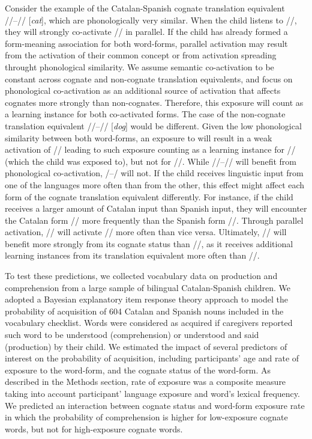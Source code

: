 \documentclass[
]{article}
\begin{document}
Consider the example of the Catalan-Spanish cognate translation
equivalent //--// {[}\emph{cat}{]}, which
are phonologically very similar. When the child listens to
//, they will strongly co-activate // in
parallel. If the child has already formed a form-meaning association for
both word-forms, parallel activation may result from the activation of
their common concept or from activation spreading throught phonological
similarity. We assume semantic co-activation to be constant across
cognate and non-cognate translation equivalents, and focus on
phonological co-activation as an additional source of activation that
affects cognates more strongly than non-cognates. Therefore, this
exposure will count as a learning instance for both co-activated forms.
The case of the non-cognate translation equivalent
//--// {[}\emph{dog}{]} would be
different. Given the low phonological similarity between both
word-forms, an exposure to  will result in a weak
activation of // leading to such exposure counting as a
learning instance for // (which the child was exposed to),
but not for //. While
//--// will benefit from phonological
co-activation, /--/ will not. If the child
receives linguistic input from one of the languages more often than from
the other, this effect might affect each form of the cognate translation
equivalent differently. For instance, if the child receives a larger
amount of Catalan input than Spanish input, they will encounter the
Catalan form // more frequently than the Spanish form
//. Through parallel activation, // will
activate // more often than vice versa. Ultimately,
// will benefit more strongly from its cognate status
than //, as it receives additional learning instances from
its translation equivalent more often than //.

To test these predictions, we collected vocabulary data on production
and comprehension from a large sample of bilingual Catalan-Spanish
children. We adopted a Bayesian explanatory item response theory
approach to model the probability of acquisition of 604 Catalan and
Spanish nouns included in the vocabulary checklist. Words were
considered as acquired if caregivers reported such word to be understood
(comprehension) or understood and said (production) by their child. We
estimated the impact of several predictors of interest on the
probability of acquisition, including participants' age and rate of
exposure to the word-form, and the cognate status of the word-form. As
described in the Methods section, rate of exposure was a composite
measure taking into account participant' language exposure and word's
lexical frequency. We predicted an interaction between cognate status
and word-form exposure rate in which the probability of comprehension is
higher for low-exposure cognate words, but not for high-exposure cognate
words.
\end{document}
